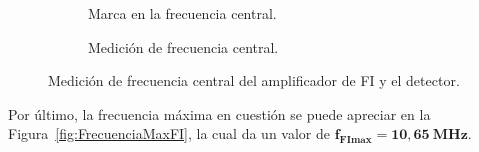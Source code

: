     \begin{figure}[H]
      \centering
      \begin{subfigure}[ht]{0.48\textwidth}
        \caption{Marca en la frecuencia central.}
        \label{fig:FrecuenciaCenFI_Osc}
      \end{subfigure}
      \hfill 
      \begin{subfigure}[ht]{0.48\textwidth}
        \caption{Medición de frecuencia central.}
        \label{fig:FrecuneciaCenFI_Gener}
      \end{subfigure}

      \caption{Medición de frecuencia central del amplificador de FI y el detector.}
      \label{fig:FrecuenciaCenFI}
    \end{figure}

    Por último, la frecuencia máxima en cuestión se puede apreciar en la Figura~\ref{fig:FrecuenciaMaxFI}, 
    la cual da un valor de $\mathbf{f_{FImax} = 10,65~MHz}$.

